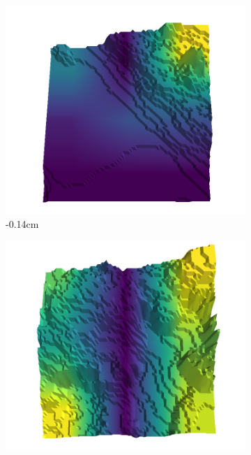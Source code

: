 \begin{figure}[H]
    \centering
    \begin{subfigure}[b]{0.192\linewidth}
    \includegraphics[width=\linewidth]{../img/5/quarry/false_negative/-14-patch-3d-majavi-colormap-0.png}
    \caption{-0.14cm}
    \label{fig : quarry-false_negative-1}
    \end{subfigure}
    \begin{subfigure}[b]{0.192\linewidth}
    \includegraphics[width=\linewidth]{../img/5/quarry/false_negative/-6-patch-3d-majavi-colormap-10.png}

\end{subfigure}
\end{figure}
